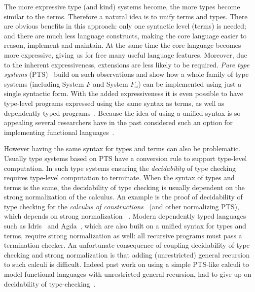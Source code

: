 The more expressive type (and kind) systems become, the more types become similar
to the terms. Therefore a natural idea is to unify terms and
types. There are obvious benefits in this approach: only one syntactic
level (terms) is needed; and there are much less language constructs,
making the core language easier to reason, implement and maintain. At the same
time the core language becomes more expressive, giving us for free
many useful language features. Moreover, due to the inherent
expressiveness, extensions are less likely to be required.
\emph{Pure type systems} (PTS)~\cite{handbook} build
on such observations and show how a whole family of type systems
(including System $F$ and System $F_{\omega}$) can be implemented
using just a single syntactic form. With the added expressiveness it
is even possible to have type-level programs expressed using the same
syntax as terms, as well as dependently typed programs~\cite{coc}.
Because the idea of using a unified syntax is so appealing several
researchers have in the past considered such an
option for implementing functional languages~\cite{cayenne, typeintype, pts:henk}.

However having the same syntax for types and terms can also be
problematic. Usually type systems based on PTS have a conversion rule
to support type-level computation.  In such type systems ensuring the
\emph{decidability} of type checking requires type-level computation
to terminate. When the syntax of types and terms is the same, the
decidability of type checking is usually dependent on the strong
normalization of the calculus. An example is the proof of decidability
of type checking for the \emph{calculus of constructions}~\cite{coc}
(and other normalizing PTS), which depends on strong normalization
~\cite{pts:normalize}. Modern dependently
typed languages such as Idris~\cite{idris} and Agda~\cite{agda}, which are also
built on a unified syntax for types and terms, require strong
normalization as well: all recursive programs must pass a termination
checker.  An unfortunate consequence of coupling
decidability of type checking and strong normalization is that adding
(unrestricted) general recursion to such calculi is difficult. Indeed
past work on using a simple PTS-like calculi to model functional languages
with unrestricted general recursion, had to give up on decidability of
type-checking~\cite{cayenne, typeintype}.

